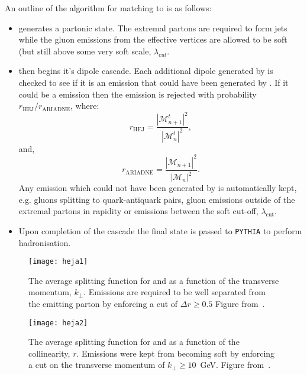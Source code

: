 		An outline of the algorithm for matching \ARIADNE to \HEJ is as follows:

		\begin{itemize}
			\item \HEJ generates a partonic state.  The extremal partons are required to form jets while
			the gluon emissions from the effective vertices are allowed to be soft (but still above some very soft scale, $\lambda_{cut}$.
			\item \ARIADNE then begins it's dipole cascade.  Each additional dipole generated by \ARIADNE is checked to see
			if it is an emission that could have been generated by \HEJ.  If it could be a \hej emission then the emission
			is rejected with probability $r_{\text{HEJ}} / r_{\text{ARIADNE}}$, where:
			\begin{equation}
				r_{\text{HEJ}} = \frac{|\mathcal{M}^t_{n+1}|^2}{|\mathcal{M}^t_{n}|^2},
			\end{equation}
			and,
			\begin{equation}
				r_{\text{ARIADNE}} = \frac{|\mathcal{M}_{n+1}|^2}{|\mathcal{M}_{n}|^2}.
			\end{equation}
			Any emission which could not have been generated by \HEJ is automatically kept, e.g. gluons splitting
			to quark-antiquark pairs, gluon emissions outside of the extremal partons in rapidity or emissions between
			the \hej soft cut-off, $\lambda_{\text{cut}}$.
			\item Upon completion of the cascade the final state is passed to \texttt{PYTHIA} to perform hadronisation.
		\end{itemize}

		\begin{figure}[hbt]
			\centering
			\texttt{[image: heja1]}
			\caption{The average splitting function for \HEJ and \ARIADNE as a function of the transverse momentum, $k_\perp$.
			Emissions are required to be well separated from the emitting parton by enforcing a cut of $\Delta r\geq0.5$
			Figure from~\cite{Andersen:2011zd}.}
			\label{fig:heja1}
		\end{figure}

		\begin{figure}[hbt]
			\centering
			\texttt{[image: heja2]}
			\caption{The average splitting function for \HEJ and \ARIADNE as a function of the collinearity, $r$.
			Emissions were kept from becoming soft by enforcing a cut on the transverse momentum of $k_\perp\geq10$~GeV.
			Figure from~\cite{Andersen:2011zd}.}
			\label{fig:heja2}
		\end{figure}

